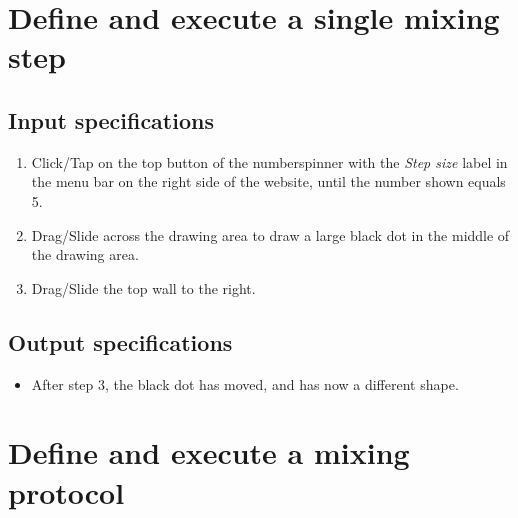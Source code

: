 \section{Define and execute a single mixing step}

\subsection*{Input specifications}
\begin{enumerate}
\item Click/Tap on the top button of the numberspinner with the \emph{Step size} label in the menu bar on the right side of the website, until the number shown equals 5.
\item Drag/Slide across the drawing area to draw a large black dot in the middle of the drawing area.
\item Drag/Slide the top wall to the right.
\end{enumerate}

\subsection*{Output specifications}
\begin{itemize}
\item After step 3, the black dot has moved, and has now a different shape.
\end{itemize}

\section{Define and execute a mixing protocol}

